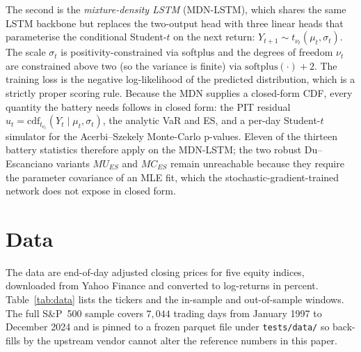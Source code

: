 \documentclass[11pt,a4paper]{article}
\newcommand{\code}[1]{\texttt{\small #1}}
\theoremstyle{plain}
\begin{document}
The second is the \emph{mixture-density LSTM} (MDN-LSTM), which
shares the same LSTM backbone but replaces the two-output head with
three linear heads that parameterise the conditional Student-$t$ on
the next return: $Y_{t+1} \sim t_{\nu_t}(\mu_t, \sigma_t)$. The
scale $\sigma_t$ is positivity-constrained via softplus and the
degrees of freedom $\nu_t$ are constrained above two (so the
variance is finite) via $\mathrm{softplus}(\cdot) + 2$. The training
loss is the negative log-likelihood of the predicted distribution,
which is a strictly proper scoring rule. Because the MDN supplies a
closed-form CDF, every quantity the battery needs follows in closed
form: the PIT residual
$u_t = \mathrm{cdf}_{t_{\nu_t}}(Y_t \mid \mu_t, \sigma_t)$, the
analytic VaR and ES, and a per-day Student-$t$ simulator for the
Acerbi--Szekely Monte-Carlo p-values. Eleven of the thirteen battery
statistics therefore apply on the MDN-LSTM; the two robust
Du--Escanciano variants $MU_{ES}$ and $MC_{ES}$ remain unreachable
because they require the parameter covariance of an MLE fit, which
the stochastic-gradient-trained network does not expose in closed
form.

\section{Data}
\label{sec:data}

The data are end-of-day adjusted closing prices for five equity
indices, downloaded from Yahoo Finance and converted to log-returns in
percent. Table~\ref{tab:data} lists the tickers and the in-sample and
out-of-sample windows. The full S\&P~500 sample covers $7{,}044$
trading days from January 1997 to December 2024 and is pinned to a
frozen parquet file under \code{tests/data/} so back-fills by the
upstream vendor cannot alter the reference numbers in this paper.
\end{document}
